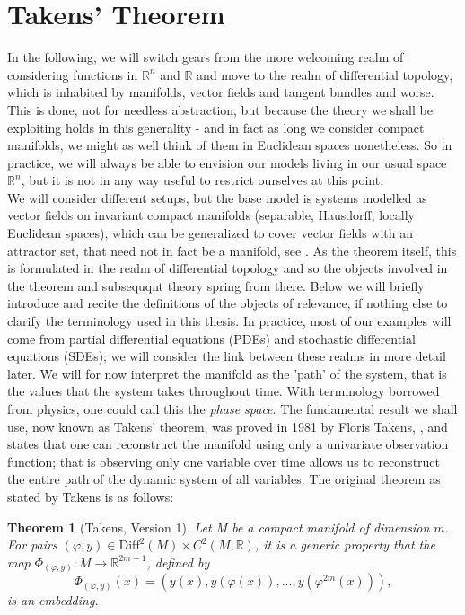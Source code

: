 \documentclass[11pt, a4paper]{memoir}
\theoremstyle{plain}
\newtheorem{thm}{Theorem}
\theoremstyle{definition}
\newcommand{\mR}{\mathbb{R}}
\begin{document}
\section{Takens' Theorem}
In the following, we will switch gears from the more welcoming realm of considering functions in $\mR^n$ and $\mR$ and move to the realm of differential topology, which is inhabited by manifolds, vector fields and tangent bundles and worse. This is done, not for needless abstraction, but because the theory we shall be exploiting holds in this generality - and in fact as long we consider compact manifolds, we might as well think of them in Euclidean spaces nonetheless. So in practice, we will always be able to envision our models living in our usual space $\mR^n$, but it is not in any way useful to restrict ourselves at this point.\\
We will consider different setups, but the base model is systems modelled as vector fields on invariant compact manifolds (separable, Hausdorff, locally Euclidean spaces), which can be generalized to cover vector fields with an attractor set, that need not in fact be a manifold, see \cite{Sauer1991}. As the theorem itself, this is formulated in the realm of differential topology and so the objects involved in the theorem and subsequqnt theory spring from there. Below we will briefly introduce and recite the definitions of the objects of relevance, if nothing else to clarify the terminology used in this thesis. In practice, most of our examples will come from partial differential equations (PDEs) and stochastic differential equations (SDEs); we will consider the link between these realms in more detail later. We will for now interpret the manifold as the 'path' of the system, that is the values that the system takes throughout time. With terminology borrowed from physics, one could call this the \textit{phase space}. The fundamental result we shall use, now known as Takens' theorem, was proved in 1981 by Floris Takens, \cite{Takens}, and states that one can reconstruct the manifold using only a univariate observation function; that is observing only one variable over time allows us to reconstruct the entire path of the dynamic system of all variables. The original theorem as stated by Takens is as follows:
\begin{thm}[Takens, Version 1]
Let M be a compact manifold of dimension $m$. For pairs $(\varphi,y)\in \text{Diff}^2(M)\times C^2(M,\mathbb{R})$, it is a generic property that the map $\Phi_{(\varphi,y)}:M\to \mathbb{R}^{2m+1}$, defined by
$$\Phi_{(\varphi,y)}(x)=(y(x),y(\varphi(x)),...,y(\varphi^{2m}(x))),$$
is an embedding. \cite{Takens}
\end{thm}
\end{document}
